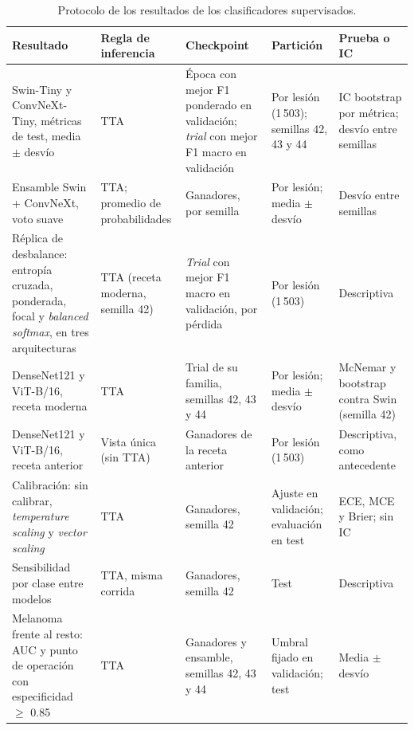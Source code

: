 \begingroup
\small
\setlength{\tabcolsep}{3pt}
\begin{table}[H]
    \centering
    \caption{Protocolo de los resultados de los clasificadores supervisados.}
    \label{tab:met_protocolos}
    \begin{tabularx}{\textwidth}{@{}>{\raggedright\arraybackslash}p{3.6cm}
        >{\raggedright\arraybackslash\hspace{0pt}}X
        >{\raggedright\arraybackslash\hspace{0pt}}X
        >{\raggedright\arraybackslash\hspace{0pt}}X
        >{\raggedright\arraybackslash\hspace{0pt}}X@{}}
        \toprule
        \textbf{Resultado} & \textbf{Regla de inferencia} & \textbf{Checkpoint} & \textbf{Partición} & \textbf{Prueba o IC} \\
        \midrule
        Swin-Tiny y ConvNeXt-Tiny, métricas de test, media $\pm$ desvío
            & TTA & Época con mejor F1 ponderado en validación; \emph{trial} con mejor F1 macro en validación
            & Por lesión (1\,503); semillas 42, 43 y 44 & IC bootstrap por métrica; desvío entre semillas \\
        \filasep
        Ensamble Swin + ConvNeXt, voto suave
            & TTA; promedio de probabilidades & Ganadores, por semilla & Por lesión; media $\pm$ desvío
            & Desvío entre semillas \\
        \filasep
        Réplica de desbalance: entropía cruzada, ponderada, focal y \emph{balanced softmax}, en tres arquitecturas
            & TTA (receta moderna, semilla 42) & \emph{Trial} con mejor F1 macro en validación, por pérdida
            & Por lesión (1\,503) & Descriptiva \\
        \filasep
        DenseNet121 y ViT-B/16, receta moderna
            & TTA & Trial de su familia, semillas 42, 43 y 44 & Por lesión; media $\pm$ desvío
            & McNemar y bootstrap contra Swin (semilla 42) \\
        \filasep
        DenseNet121 y ViT-B/16, receta anterior
            & Vista única (sin TTA) & Ganadores de la receta anterior & Por lesión (1\,503)
            & Descriptiva, como antecedente \\
        \filasep
        Calibración: sin calibrar, \emph{temperature scaling} y \emph{vector scaling}
            & TTA & Ganadores, semilla 42 & Ajuste en validación; evaluación en test
            & ECE, MCE y Brier; sin IC \\
        \filasep
        Sensibilidad por clase entre modelos
            & TTA, misma corrida & Ganadores, semilla 42 & Test & Descriptiva \\
        \filasep
        Melanoma frente al resto: AUC y punto de operación con especificidad $\geq$ 0.85
            & TTA & Ganadores y ensamble, semillas 42, 43 y 44 & Umbral fijado en validación; test
            & Media $\pm$ desvío \\
        \bottomrule
    \end{tabularx}
\end{table}
\endgroup

